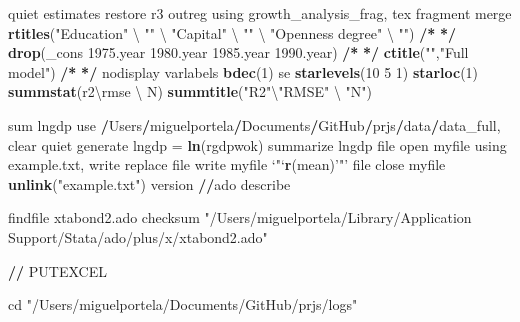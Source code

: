 \documentclass[
  12pt,
]{article}
\newenvironment{Shaded}{\begin{snugshade}}{\end{snugshade}}
\newcommand{\DataTypeTok}[1]{\textcolor[rgb]{0.13,0.29,0.53}{#1}}
\newcommand{\DecValTok}[1]{\textcolor[rgb]{0.00,0.00,0.81}{#1}}
\newcommand{\ErrorTok}[1]{\textcolor[rgb]{0.64,0.00,0.00}{\textbf{#1}}}
\newcommand{\FloatTok}[1]{\textcolor[rgb]{0.00,0.00,0.81}{#1}}
\newcommand{\KeywordTok}[1]{\textcolor[rgb]{0.13,0.29,0.53}{\textbf{#1}}}
\newcommand{\NormalTok}[1]{#1}
\newcommand{\OperatorTok}[1]{\textcolor[rgb]{0.81,0.36,0.00}{\textbf{#1}}}
\newcommand{\StringTok}[1]{\textcolor[rgb]{0.31,0.60,0.02}{#1}}
\begin{document}
\begin{Shaded}
\begin{Highlighting}[]
{\NormalTok{    quiet estimates restore r3}
\NormalTok{        outreg using growth_analysis_frag, tex fragment merge }\KeywordTok{rtitles}\NormalTok{(}\StringTok{"Education"}\NormalTok{ \textbackslash{} }\StringTok{""}\NormalTok{ \textbackslash{} }\StringTok{"Capital"}\NormalTok{ \textbackslash{} }\StringTok{""}\NormalTok{ \textbackslash{} }\StringTok{"Openness degree"}\NormalTok{ \textbackslash{} }\StringTok{""}\NormalTok{)  }\OperatorTok{/}\ErrorTok{*}
\StringTok{                }\ErrorTok{*/}\StringTok{ }\KeywordTok{drop}\NormalTok{(_cons }\FloatTok{1975.}\NormalTok{year }\FloatTok{1980.}\NormalTok{year }\FloatTok{1985.}\NormalTok{year }\FloatTok{1990.}\NormalTok{year) }\OperatorTok{/}\ErrorTok{*}
\StringTok{                }\ErrorTok{*/}\StringTok{ }\KeywordTok{ctitle}\NormalTok{(}\StringTok{""}\NormalTok{,}\StringTok{"Full model"}\NormalTok{) }\OperatorTok{/}\ErrorTok{*}
\StringTok{                }\ErrorTok{*/}\StringTok{ }\NormalTok{nodisplay varlabels }\KeywordTok{bdec}\NormalTok{(}\DecValTok{1}\NormalTok{) se }\KeywordTok{starlevels}\NormalTok{(}\DecValTok{10} \DecValTok{5} \DecValTok{1}\NormalTok{) }\KeywordTok{starloc}\NormalTok{(}\DecValTok{1}\NormalTok{) }\KeywordTok{summstat}\NormalTok{(r2\textbackslash{}rmse \textbackslash{} N) }\KeywordTok{summtitle}\NormalTok{(}\StringTok{"R2"}\NormalTok{\textbackslash{}}\StringTok{"RMSE"}\NormalTok{ \textbackslash{} }\StringTok{"N"}\NormalTok{)}

\NormalTok{sum lngdp}
\NormalTok{use }\OperatorTok{/}\NormalTok{Users}\OperatorTok{/}\NormalTok{miguelportela}\OperatorTok{/}\NormalTok{Documents}\OperatorTok{/}\NormalTok{GitHub}\OperatorTok{/}\NormalTok{prjs}\OperatorTok{/}\NormalTok{data}\OperatorTok{/}\NormalTok{data_full, clear}
\NormalTok{        quiet generate lngdp =}\StringTok{ }\KeywordTok{ln}\NormalTok{(rgdpwok)}
\NormalTok{      summarize lngdp}
\NormalTok{file open myfile using example.txt, write replace}
\NormalTok{file write myfile }\StringTok{`}\DataTypeTok{"}\StringTok{`}\KeywordTok{r}\NormalTok{(mean)}\StringTok{'"'}
\NormalTok{file close myfile}
\KeywordTok{unlink}\NormalTok{(}\StringTok{"example.txt"}\NormalTok{)}
\NormalTok{version}
\OperatorTok{/}\ErrorTok{/}\NormalTok{ado describe}

\NormalTok{findfile xtabond2.ado}
\NormalTok{checksum }\StringTok{"/Users/miguelportela/Library/Application Support/Stata/ado/plus/x/xtabond2.ado"}

\OperatorTok{/}\ErrorTok{/}\StringTok{ }\NormalTok{PUTEXCEL}

\NormalTok{cd }\StringTok{"/Users/miguelportela/Documents/GitHub/prjs/logs"}

}
\end{Highlighting}
\end{Shaded}
\end{document}
